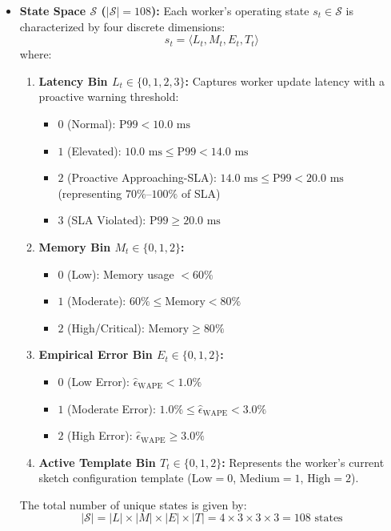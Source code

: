 \begin{itemize}
 \item \textbf{State Space $\mathcal{S}$ ($|\mathcal{S}| = 108$):} Each worker's operating state $s_t \in \mathcal{S}$ is characterized by four discrete dimensions:
 \begin{equation}
        s_t = \langle L_t, M_t, E_t, T_t \rangle
    \end{equation}
 where:
 \begin{enumerate}
 \item \textbf{Latency Bin $L_t \in \{0, 1, 2, 3\}$:} Captures worker update latency with a proactive warning threshold:
 \begin{itemize}
 \item $0$ (Normal): $\text{P99} < 10.0\text{ ms}$
 \item $1$ (Elevated): $10.0\text{ ms} \le \text{P99} < 14.0\text{ ms}$
 \item $2$ (Proactive Approaching-SLA): $14.0\text{ ms} \le \text{P99} < 20.0\text{ ms}$ (representing $70\%\text{--}100\%$ of SLA)
 \item $3$ (SLA Violated): $\text{P99} \ge 20.0\text{ ms}$
 \end{itemize}
 \item \textbf{Memory Bin $M_t \in \{0, 1, 2\}$:}
 \begin{itemize}
 \item $0$ (Low): Memory usage $< 60\%$
 \item $1$ (Moderate): $60\% \le \text{Memory} < 80\%$
 \item $2$ (High/Critical): $\text{Memory} \ge 80\%$
 \end{itemize}
 \item \textbf{Empirical Error Bin $E_t \in \{0, 1, 2\}$:}
 \begin{itemize}
 \item $0$ (Low Error): $\hat{\epsilon}_{\text{WAPE}} < 1.0\%$
 \item $1$ (Moderate Error): $1.0\% \le \hat{\epsilon}_{\text{WAPE}} < 3.0\%$
 \item $2$ (High Error): $\hat{\epsilon}_{\text{WAPE}} \ge 3.0\%$
 \end{itemize}
 \item \textbf{Active Template Bin $T_t \in \{0, 1, 2\}$:} Represents the worker's current sketch configuration template ($\text{Low} = 0$, $\text{Medium} = 1$, $\text{High} = 2$).
 \end{enumerate}
 The total number of unique states is given by:
 \begin{equation}
        |\mathcal{S}| = |L| \times |M| \times |E| \times |T| = 4 \times 3 \times 3 \times 3 = 108 \text{ states}
    \end{equation}


\end{itemize}
